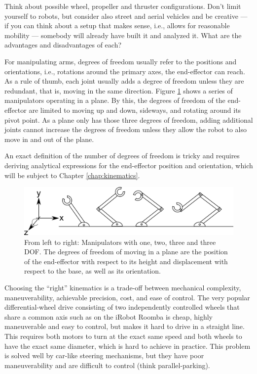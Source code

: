 \begin{framed}Think about possible wheel, propeller and thruster configurations. Don't limit yourself to robots, but consider also street and aerial vehicles and be creative --- if you can think about a setup that makes sense, i.e., allows for reasonable mobility --- somebody will already have built it and analyzed it. What are the advantages and disadvantages of each?
\end{framed}

For manipulating arms, degrees of freedom usually refer to the positions and orientations, i.e., rotations around the primary axes, the end-effector can reach. As a rule of thumb, each joint usually adds a degree of freedom unless they are redundant, that is, moving in the same direction. Figure \ref{fig:basickinematics} shows a series of manipulators operating in a plane. By this, the degrees of freedom of the end-effector are limited to moving up and down, sideways, and rotating around its pivot point. As a plane only has those three degrees of freedom, adding additional joints cannot increase the degrees of freedom unless they allow the robot to also move in and out of the plane. 

An exact definition of the number of degrees of freedom is tricky and requires deriving analytical expressions for the end-effector position and orientation, which will be subject to Chapter \ref{chap:kinematics}.

\begin{figure}
	\centering
		\includegraphics[width=\textwidth]{figs/basickinematics.png}
	\caption{From left to right: Manipulators with one, two, three and three DOF. The degrees of freedom of moving in a plane are the position of the end-effector with respect to its height and displacement with respect to the base, as well as its orientation.}
	\label{fig:basickinematics}
\end{figure}

Choosing the ``right'' kinematics is a trade-off between mechanical complexity, maneuverability, achievable precision, cost, and ease of control. The very popular differential-wheel drive consisting of two independently controlled wheels that share a common axis such as on the iRobot Roomba is cheap, highly maneuverable and easy to control, but makes it hard to drive in a straight line. This requires both motors to turn at the exact same speed and both wheels to have the exact same diameter, which is hard to achieve in practice. This problem is solved well by car-like steering mechanisms, but they have poor maneuverability and are difficult to control (think parallel-parking).


